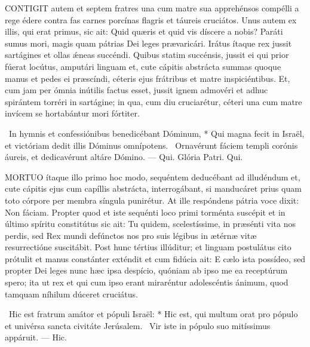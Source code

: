 
\lettrine[lines=2]{C}{ONTIGIT} autem et septem fratres una cum matre sua apprehénsos compélli a rege édere contra fas carnes porcínas flagris et táureis cruciátos. Unus autem ex illis, qui erat primus, sic ait: Quid quæris et quid vis díscere a nobis? Paráti sumus mori, magis quam pátrias Dei leges prævaricári. Irátus ítaque rex jussit sartágines et ollas ǽneas succéndi. Quibus statim succénsis, jussit ei qui prior fúerat locútus, amputári linguam et, cute cápitis abstrácta summas quoque manus et pedes ei præscíndi, céteris ejus frátribus et matre inspiciéntibus. Et, cum jam per ómnia inútilis factus esset, jussit ignem admovéri et adhuc spirántem torréri in sartágine; in qua, cum diu cruciarétur, céteri una cum matre invícem se hortabántur mori fórtiter.

\R\ In hymnis et confessiónibus benedicébant Dóminum, * Qui magna fecit in Israël, et victóriam dedit illis Dóminus omnípotens. \V\ Ornavérunt fáciem templi corónis áureis, et dedicavérunt altáre Dómino. — Qui. Glória Patri. Qui.




\lettrine[lines=2]{M}{ORTUO} ítaque illo primo hoc modo, sequéntem deducébant ad illudéndum et, cute cápitis ejus cum capíllis abstrácta, interrogábant, si manducáret prius quam toto córpore per membra síngula punirétur. At ille respóndens pátria voce dixit: Non fáciam. Propter quod et iste sequénti loco primi torménta suscépit et in último spíritu constitútus sic ait: Tu quidem, scelestíssime, in præsénti vita nos perdis, sed Rex mundi defúnctos nos pro suis légibus in ætérnæ vitæ resurrectióne suscitábit. Post hunc tértius illúditur; et linguam postulátus cito prótulit et manus constánter exténdit et cum fidúcia ait: E cælo ista possídeo, sed propter Dei leges nunc hæc ipsa despício, quóniam ab ipso me ea receptúrum spero; ita ut rex et qui cum ipso erant miraréntur adolescéntis ánimum, quod tamquam níhilum dúceret cruciátus.

\R\ Hic est fratrum amátor et pópuli Israël: * Hic est, qui multum orat pro pópulo et univérsa sancta civitáte Jerúsalem. \V\ Vir iste in pópulo suo mitíssimus appáruit. — Hic.


